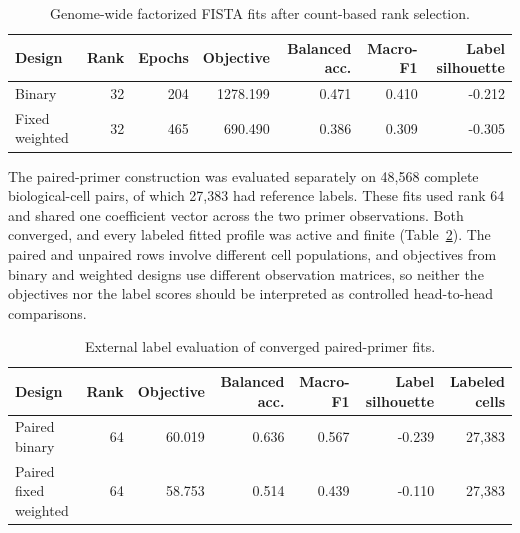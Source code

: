 \documentclass[11pt]{article}
\begin{document}
\begin{table}[h]
  \centering
  \footnotesize
  \begin{tabular}{lrrrrrr}
    \toprule
    Design & Rank & Epochs & Objective & Balanced acc. & Macro-F1 & Label silhouette \\
    \midrule
    Binary         & 32 & 204 & 1278.199 & 0.471 & 0.410 & -0.212 \\
    Fixed weighted & 32 & 465 &  690.490 & 0.386 & 0.309 & -0.305 \\
    \bottomrule
  \end{tabular}
  \caption{Genome-wide factorized FISTA fits after count-based rank selection.}
  \label{tab:fista-validation}
\end{table}

The paired-primer construction was evaluated separately on 48,568 complete
biological-cell pairs, of which 27,383 had reference labels. These fits used
rank 64 and shared one coefficient vector across the two primer observations.
Both converged, and every labeled fitted profile was active and finite
(Table~\ref{tab:paired-validation}). The paired and unpaired rows involve
different cell populations, and objectives from binary and weighted designs
use different observation matrices, so neither the objectives nor the label
scores should be interpreted as controlled head-to-head comparisons.

\begin{table}[h]
  \centering
  \footnotesize
  \begin{tabular}{lrrrrrr}
    \toprule
    Design & Rank & Objective & Balanced acc. & Macro-F1 & Label silhouette & Labeled cells \\
    \midrule
    Paired binary         & 64 & 60.019 & 0.636 & 0.567 & -0.239 & 27,383 \\
    Paired fixed weighted & 64 & 58.753 & 0.514 & 0.439 & -0.110 & 27,383 \\
    \bottomrule
  \end{tabular}
  \caption{External label evaluation of converged paired-primer fits.}
  \label{tab:paired-validation}
\end{table}
\end{document}
